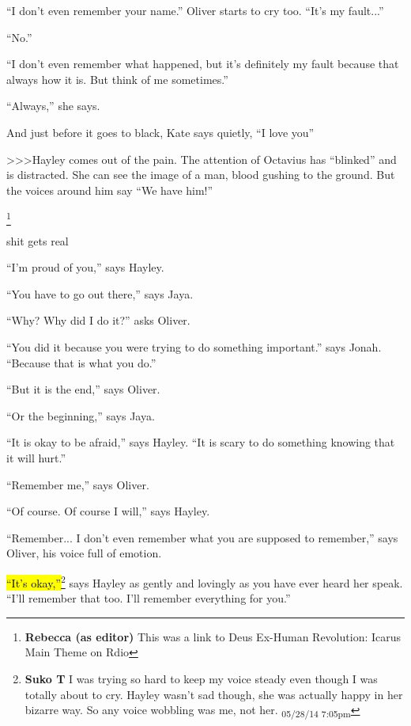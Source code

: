 ``I don't even remember your name.'' Oliver starts to cry too.  ``It's my fault...''

``No.''

``I don't even remember what happened, but it's definitely my fault because that always how it is.  But think of me sometimes.''

``Always,'' she says.



And just before it goes to black, Kate says quietly, ``I love you''



\textgreater \textgreater \textgreater  Hayley comes out of the pain.  The attention of Octavius has ``blinked'' and is distracted.  She can see the image of a man, blood gushing to the ground.  But the voices around him say ``We have him!''



 \footnote{\textbf{Rebecca (as editor) }This was a link to Deus Ex-Human Revolution: Icarus Main Theme on Rdio}

shit gets real



``I'm proud of you,'' says Hayley.



``You have to go out there,'' says Jaya.

``Why?  Why did I do it?'' asks Oliver.

``You did it because you were trying to do something important.'' says Jonah.  ``Because that is what you do.''

``But it is the end,'' says Oliver.

``Or the beginning,'' says Jaya.



``It is okay to be afraid,'' says Hayley.  ``It is scary to do something knowing that it will hurt.''



``Remember me,'' says Oliver.

``Of course.  Of course I will,'' says Hayley.

``Remember... I don't even remember what you are supposed to remember,'' says Oliver, his voice full of emotion.

\hl{``It's okay,''}\footnote{\textbf{Suko T }I was trying so hard to keep my voice steady even though I was totally about to cry.  Hayley wasn't sad though, she was actually happy in her bizarre way.  So any voice wobbling was me, not her. \textsubscript{05/28/14 7:05pm}} says Hayley as gently and lovingly as you have ever heard her speak.  ``I'll remember that too.  I'll remember everything for you.''

